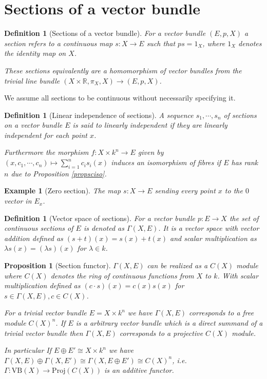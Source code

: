 \documentclass[12pt]{report}
\numberwithin{equation}{section}
\newcommand{\R}{\mathbb{R}}
\newtheorem{definition}[dummy]{Definition}
\newtheorem{proposition}[dummy]{Proposition}
\newtheorem{example}[dummy]{Example}
\begin{document}
	\section{Sections of a vector bundle}
	
	\begin{definition}[Sections of a vector bundle]
		For a vector bundle $(E,p,X)$ a section refers to a continuous map	$s: X \to E$ such that $p s= 1_X$, where $1_X$ denotes the identity map on $X$.
		
		These sections equivalently are a homomorphism of vector bundles from the trivial line bundle $(X \times \R, \pi_X, X) \to (E,p,X)$.
	\end{definition}
	We assume all sections to be continuous without necessarily specifying it.
	
	\begin{definition}[Linear independence of sections]\label{deflinindsections}
		A sequence $s_1, \cdots, s_n$ of sections on a vector bundle $E$ is said to linearly independent if they are linearly independent for each point $x$.
		
		Furthermore the morphism $f: X \times k^n \to E$ given by $(x,c_1, \cdots, c_n) \mapsto \sum_{i=1}^n c_i s_i(x)$ induces an isomorphism of fibres if $E$ has rank $n$ due to Proposition \ref{propsciso}.
		
	\end{definition}
	
	\begin{example}[Zero section]
		The map $s:X \to E $ sending every point $x$ to the $0$ vector in $E_x$.	
	\end{example}
	\begin{definition}[Vector space of sections]
		For a vector bundle $p:E \to X $ the set of continuous sections of $E$ is denoted as $\Gamma (X ,E)$. It is a vector space with vector addition defined as $(s+t)(x)=s(x)+t(x)$ and scalar multiplication as $\lambda s (x) = (\lambda s)(x)$ for $\lambda \in k$.	
	\end{definition}
	
	\begin{proposition}[Section functor]\label{sectionfunctor}
		$\Gamma(X,E)$ can be realized as a $C(X)$ module where $C(X)$ denotes the ring of continuous functions from $X$ to $k$. With scalar multiplication defined as $(c \cdot s)(x)=c(x) s(x)$ for $s\in \Gamma(X,E), c \in C(X)$.
		
		For a trivial vector bundle $E=X \times k^n$ we have $\Gamma(X,E)$ corresponds to a free module $ C(X)^n$. If $E$ is a arbitrary vector bundle which is a direct summand of a trivial vector bundle then $\Gamma(X,E) $ corresponds to a projective $C(X)$ module.
		
		In particular If $E \oplus E' \cong X \times k^n$ we have $\Gamma(X, E) \oplus \Gamma(X,E') \cong \Gamma(X, E \oplus E') \cong C(X)^n$, i.e. $\Gamma: \mathrm{VB}(X) \to \mathrm{Proj}(C(X))$ is an additive functor.
	\end{proposition}
	
\end{document}
